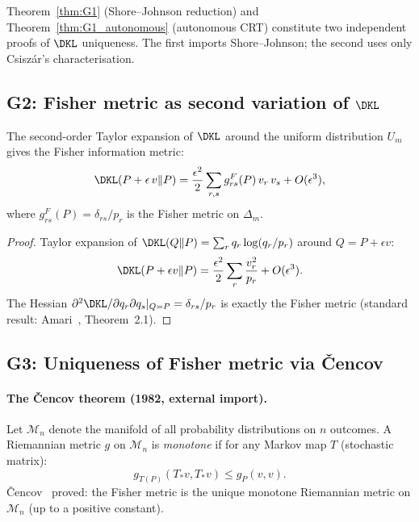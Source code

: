 \documentclass[12pt,a4paper]{article}
\begin{document}
\begin{remark}
Theorem~\ref{thm:G1} (Shore--Johnson reduction) and
Theorem~\ref{thm:G1_autonomous} (autonomous CRT) constitute two
independent proofs of $\DKL$ uniqueness. The first imports Shore--Johnson;
the second uses only Csisz\'ar's characterisation.
\end{remark}

\subsection{G2: Fisher metric as second variation of $\DKL$}
\label{sec:G2}

\mTHM
\begin{theorem}
\label{thm:G2}
The second-order Taylor expansion of $\DKL$ around the uniform distribution $U_m$
gives the Fisher information metric:
\[
  \DKL(P + \epsilon\, v \| P) = \frac{\epsilon^2}{2} \sum_{r,s}
  g_{rs}^F(P)\, v_r\, v_s + O(\epsilon^3),
\]
where $g_{rs}^F(P) = \delta_{rs}/p_r$ is the Fisher metric on $\Delta_m$.

\begin{proof}
Taylor expansion of $\DKL(Q\|P) = \sum_r q_r \log(q_r/p_r)$ around
$Q = P + \epsilon v$:
\[
  \DKL(P+\epsilon v \| P) = \frac{\epsilon^2}{2} \sum_r \frac{v_r^2}{p_r}
  + O(\epsilon^3).
\]
The Hessian $\partial^2 \DKL / \partial q_r \partial q_s |_{Q=P} = \delta_{rs}/p_r$
is exactly the Fisher metric (standard result: Amari~\cite{Amari1985},
Theorem~2.1).
\end{proof}
\end{theorem}

\subsection{G3: Uniqueness of Fisher metric via \v Cencov}
\label{sec:G3}

\paragraph{The \v Cencov theorem (1982, external import).}
Let $\mathcal{M}_n$ denote the manifold of all probability distributions
on $n$ outcomes. A Riemannian metric $g$ on $\mathcal{M}_n$ is
\emph{monotone} if for any Markov map $T$ (stochastic matrix):
\[
  g_{T(P)}(T_* v, T_* v) \leq g_P(v, v).
\]
\v{C}encov~\cite{Cencov1982} proved: the Fisher metric is the unique monotone
Riemannian metric on $\mathcal{M}_n$ (up to a positive constant).
\end{document}
